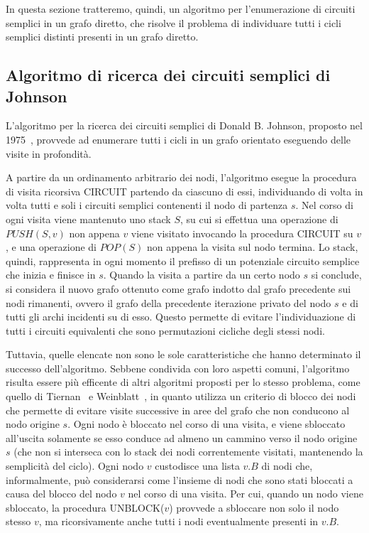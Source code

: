 In questa sezione tratteremo, quindi, un algoritmo per l'enumerazione di circuiti semplici in un grafo diretto, che
risolve il problema di individuare tutti i cicli semplici distinti presenti in un grafo diretto.


\subsection{Algoritmo di ricerca dei circuiti semplici di Johnson} \label{subsec:algoritmo-di-jhonson}
L'algoritmo per la ricerca dei circuiti semplici di Donald B. Johnson, proposto nel 1975~\cite{doi:10.1137/0204007},
provvede ad enumerare tutti i cicli in un grafo orientato eseguendo delle visite in profondit\`a. \newline

A partire da un ordinamento arbitrario dei nodi, l'algoritmo esegue la procedura di visita ricorsiva CIRCUIT partendo
da ciascuno di essi, individuando di volta in volta tutti e soli i circuiti semplici contenenti il nodo di partenza $s$.
Nel corso di ogni visita viene mantenuto uno stack $S$, su cui si effettua una operazione di $PUSH(S, v)$ non
appena $v$ viene visitato invocando la procedura CIRCUIT su $v$, e una operazione di $POP(S)$ non appena la visita
sul nodo termina.
Lo stack, quindi, rappresenta in ogni momento il prefisso di un potenziale circuito semplice che inizia e finisce in $s$.
Quando la visita a partire da un certo nodo $s$ si conclude, si considera il nuovo grafo ottenuto come grafo indotto
dal grafo precedente sui nodi rimanenti, ovvero il grafo della precedente iterazione privato del nodo $s$ e di tutti
gli archi incidenti su di esso.
Questo permette di evitare l'individuazione di tutti i circuiti equivalenti che sono permutazioni cicliche degli stessi
nodi. \newline

Tuttavia, quelle elencate non sono le sole caratteristiche che hanno determinato il successo dell'algoritmo.
Sebbene condivida con loro aspetti comuni, l'algoritmo risulta essere pi\`u efficente di altri algoritmi
proposti per lo stesso problema, come quello di Tiernan~\cite{10.1145/362814.362819} e
Weinblatt~\cite{10.1145/321679.321684}, in quanto utilizza un criterio di blocco
dei nodi che permette di evitare visite successive in aree del grafo che non conducono al nodo origine $s$.
Ogni nodo \`e bloccato nel corso di una visita, e viene sbloccato all'uscita solamente se esso conduce ad almeno
un cammino verso il nodo origine $s$ (che non si interseca con lo stack dei nodi correntemente visitati, mantenendo
la semplicit\`a del ciclo).
Ogni nodo $v$ custodisce una lista $v.B$ di nodi che, informalmente, pu\`o considerarsi come l'insieme di nodi
che sono stati bloccati a causa del blocco del nodo $v$ nel corso di una visita.
Per cui, quando un nodo viene sbloccato, la procedura UNBLOCK($v$) provvede a sbloccare non solo il nodo stesso $v$,
ma ricorsivamente anche tutti i nodi eventualmente presenti in $v.B$.

